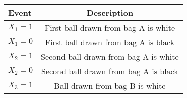 \begin{tabular}{|l|c|}

\hline
\textbf{Event} & \textbf{Description} \\
\hline
$X_1 = 1$ &  First ball drawn from bag A is white \\
\hline
$X_1 = 0$ &  First ball drawn from bag A is black \\
\hline
$X_2 = 1$ &  Second ball drawn from bag A is white \\
\hline
$X_2 = 0$ &  Second ball drawn from bag A is black \\
\hline
$X_3 = 1$ &  Ball drawn from bag B is white \\
\hline
\end{tabular}